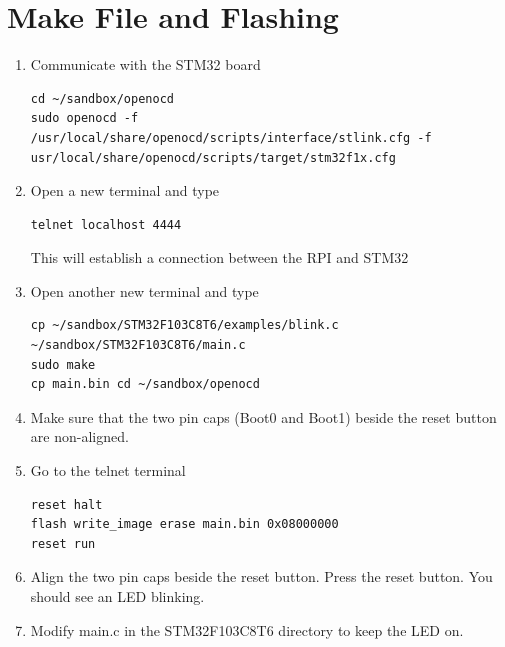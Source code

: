 \documentclass[journal,12pt,twocolumn]{IEEEtran}
\begin{document}
\section{Make File and Flashing}
\begin{enumerate}[1.]
\item Communicate with the STM32 board
\begin{lstlisting}
cd ~/sandbox/openocd
sudo openocd -f /usr/local/share/openocd/scripts/interface/stlink.cfg -f usr/local/share/openocd/scripts/target/stm32f1x.cfg
\end{lstlisting}
\item Open a new terminal and type
\begin{lstlisting}
telnet localhost 4444
\end{lstlisting}
This will establish a connection between the RPI and STM32
\item Open another new terminal and type
\begin{lstlisting}
cp ~/sandbox/STM32F103C8T6/examples/blink.c ~/sandbox/STM32F103C8T6/main.c
sudo make
cp main.bin cd ~/sandbox/openocd
\end{lstlisting}
\item Make sure that the two pin caps (Boot0 and Boot1) beside the reset button are non-aligned.
\item Go to the telnet terminal 
\begin{lstlisting}
reset halt
flash write_image erase main.bin 0x08000000
reset run
\end{lstlisting}
\item Align the two pin caps beside the reset button. Press the reset button.  You should see an LED blinking.
\item Modify main.c in the STM32F103C8T6 directory to keep the LED on.
%
\end{enumerate}
\end{document}
